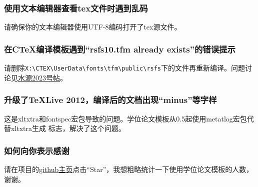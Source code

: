 \subsubsection*{使用文本编辑器查看tex文件时遇到乱码}
请确保你的文本编辑器使用UTF-8编码打开了tex源文件。

\subsubsection*{在CTeX编译模板遇到``rsfs10.tfm already exists''的错误提示}
请删除\verb+X:\CTEX\UserData\fonts\tfm\public\rsfs+下的文件再重新编译。问题讨论见\href{https://bbs.sjtu.edu.cn/bbstcon,board,TeX_LaTeX,reid,1352982719.html}{水源2023号帖}。

\subsubsection*{升级了TeXLive 2012，编译后的文档出现``minus''等字样}
这是xltxtra和fontspec宏包导致的问题。学位论文模板从0.5起使用metatlog宏包代替xltxtra生成 \XeTeX 标志，解决了这个问题。

\subsubsection*{如何向你表示感谢}
请在项目的\href{https://github.com/weijianwen/sjtu-thesis-template-latex}{github主页}点击``Star''，我想粗略统计一下使用学位论文模板的人数，谢谢。
